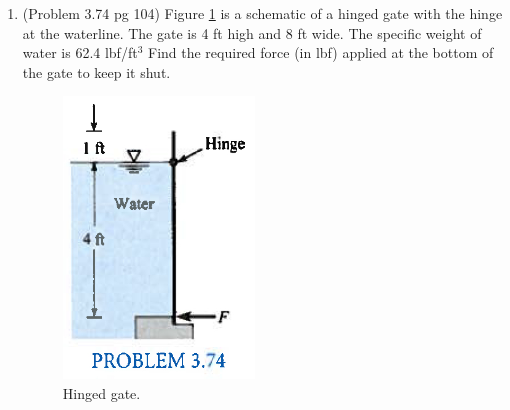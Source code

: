 \documentclass[12pt]{article}
\begin{document}
\begin{enumerate}
\item (Problem 3.74 pg 104)
Figure \ref{fig:HingeGate} is a schematic of a hinged gate with the hinge at the waterline.   
The gate is 4 ft high and 8 ft wide.  
The specific weight of water is 62.4 lbf/ft$^3$
Find the required force (in lbf) applied at the bottom of the gate to keep it shut.
\begin{figure}[htbp] %
   \centering
   \includegraphics[width=2in]{HingeGate.jpg} 
   \caption{Hinged gate.}
   \label{fig:HingeGate}
\end{figure}

\end{enumerate}
\end{document}
